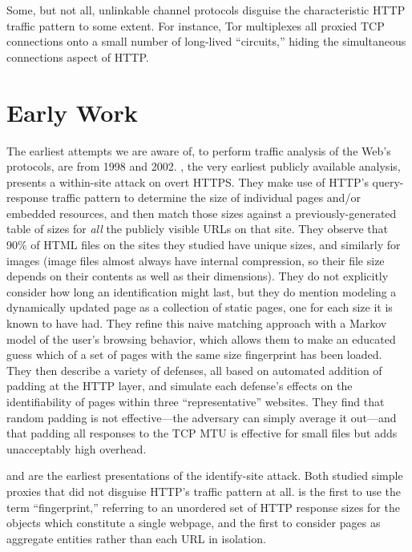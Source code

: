 \documentclass{zarticle}
\begin{document}
Some, but not all, unlinkable channel protocols disguise the
characteristic HTTP traffic pattern to some extent.  For instance, Tor
multiplexes all proxied TCP connections onto a small number of
long-lived “circuits,” hiding the simultaneous connections aspect of
HTTP.

\section{Early Work}

The earliest attempts we are aware of, to perform traffic analysis of
the Web's protocols, are from 1998 and 2002.
\textcite{cheng1998traffic}, the very earliest publicly available
analysis, presents a within-site attack on overt HTTPS.  They make use
of HTTP's query-response traffic pattern to determine the size of
individual pages and/or embedded resources, and then match those sizes
against a previously-generated table of sizes for \emph{all} the
publicly visible URLs on that site.  They observe that 90\% of HTML
files on the sites they studied have unique sizes, and similarly for
images (image files almost always have internal compression, so their
file size depends on their contents as well as their dimensions).
They do not explicitly consider how long an identification might last,
but they do mention modeling a dynamically updated page as a
collection of static pages, one for each size it is known to have had.
They refine this naive matching approach with a Markov model of the
user's browsing behavior, which allows them to make an educated guess
which of a set of pages with the same size fingerprint has been
loaded.  They then describe a variety of defenses, all based on
automated addition of padding at the HTTP layer, and simulate each
defense's effects on the identifiability of pages within three
“representative” websites.  They find that random padding is not
effective---the adversary can simply average it out---and that padding
all responses to the TCP MTU is effective for small files but adds
unacceptably high overhead.

\textcite{hintz2002fingerprinting} and \textcite{sun2002statistical}
are the earliest presentations of the identify-site attack.  Both
studied simple proxies that did not disguise HTTP's traffic pattern at
all.  \citeauthor{hintz2002fingerprinting} is the first to use the
term “fingerprint,” referring to an unordered set of HTTP response
sizes for the objects which constitute a single webpage, and the first
to consider pages as aggregate entities rather than each URL in
isolation.  \citeauthor{sun2002statistical} 
\end{document}
